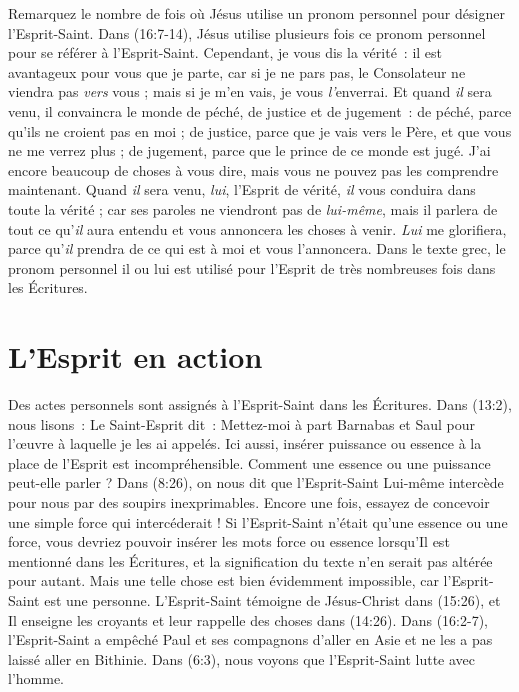 Remarquez le nombre de fois où Jésus utilise un pronom personnel pour
 désigner l'Esprit-Saint. Dans (16:7-14), Jésus utilise
 plusieurs fois ce pronom personnel pour se référer à l'Esprit-Saint.
 \Og Cependant, je vous dis la vérité~: il est avantageux pour vous
 que je parte, car si je ne pars pas, le Consolateur ne viendra pas
 \emph{vers} vous ; mais si je m'en vais, je vous \emph{l'}enverrai.
 Et quand \emph{il} sera venu, il convaincra le monde de péché,
 de justice et de jugement~: de péché, parce qu'ils ne croient pas en moi ;
 de justice, parce que je vais vers le Père, et que vous ne me verrez plus ;
 de jugement, parce que le prince de ce monde est jugé.
 J'ai encore beaucoup de choses à vous dire, mais vous ne pouvez pas
 les comprendre maintenant. Quand \emph{il} sera venu, \emph{lui},
 l'Esprit de vérité, \emph{il} vous conduira dans toute la vérité ;
 car ses paroles ne viendront pas de \emph{lui-même}, mais il parlera de
 tout ce qu'\emph{il} aura entendu et vous annoncera les choses à venir.
 \emph{Lui} me glorifiera, parce qu'\emph{il} prendra de ce qui est à moi
 et vous l'annoncera. \Fg{}
 Dans le texte grec, le pronom personnel \Og il \Fg{} ou \Og lui \Fg{}
 est utilisé pour l'Esprit de très nombreuses fois dans les Écritures.

\section{L'Esprit en action}

Des actes personnels sont assignés à l'Esprit-Saint dans les
 Écritures. Dans (13:2), nous lisons~: \Og Le Saint-Esprit dit~:
 Mettez-moi à part Barnabas et Saul pour l'œuvre à laquelle je les ai
 appelés. \Fg{}
 Ici aussi, insérer \Og puissance \Fg{} ou \Og essence \Fg{} à la place
 de l'Esprit est incompréhensible. Comment une essence ou une puissance
 peut-elle parler ? Dans (8:26), on nous dit que l'Esprit-Saint
 Lui-même intercède pour nous par des soupirs inexprimables.
 Encore une fois, essayez de concevoir une simple force qui intercéderait !
 Si l'Esprit-Saint n'était qu'une essence ou une force, vous devriez pouvoir
 insérer les mots \Og force \Fg{} ou \Og essence \Fg{} lorsqu'Il est mentionné
 dans les Écritures, et la signification du texte n'en serait pas altérée pour
 autant. Mais une telle chose est bien évidemment impossible, car
 l'Esprit-Saint est une personne. L'Esprit-Saint témoigne de Jésus-Christ dans
 (15:26), et Il enseigne les croyants et leur rappelle des choses
 dans (14:26). Dans (16:2-7), l'Esprit-Saint a
 empêché Paul et ses compagnons d'aller en Asie et ne les a pas laissé aller
 en Bithinie. Dans (6:3), nous voyons que l'Esprit-Saint lutte
 avec l'homme.

